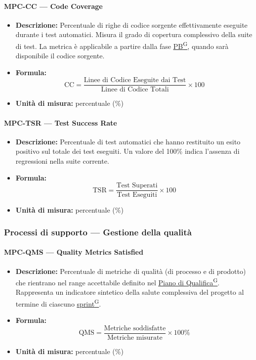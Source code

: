 \documentclass[a4paper,12pt]{article}
\providecommand{\glslink}[2]{\href{https://alittlebyte-19.github.io/Documentazione/glossario.html\#gls-#1}{\underline{#2}\textsuperscript{\scriptsize G}}}
\begin{document}
\paragraph{MPC-CC --- Code Coverage}
\begin{itemize}
    \item \textbf{Descrizione:} Percentuale di righe di codice sorgente effettivamente eseguite durante i test automatici. Misura il grado di copertura complessivo della suite di test. La metrica è applicabile a partire dalla fase \glslink{pb-product-baseline}{PB}, quando sarà disponibile il codice sorgente.
    \item \textbf{Formula:}
    $$\text{CC} = \frac{\text{Linee di Codice Eseguite dai Test}}{\text{Linee di Codice Totali}} \times 100$$
    \item \textbf{Unità di misura:} percentuale (\%)
\end{itemize}

\paragraph{MPC-TSR --- Test Success Rate}
\begin{itemize}
    \item \textbf{Descrizione:} Percentuale di test automatici che hanno restituito un esito positivo sul totale dei test eseguiti. Un valore del 100\% indica l'assenza di regressioni nella suite corrente.
    \item \textbf{Formula:}
    $$\text{TSR} = \frac{\text{Test Superati}}{\text{Test Eseguiti}} \times 100$$
    \item \textbf{Unità di misura:} percentuale (\%)
\end{itemize}

\subsubsection{Processi di supporto --- Gestione della qualità}

\paragraph{MPC-QMS --- Quality Metrics Satisfied}
\begin{itemize}
    \item \textbf{Descrizione:} Percentuale di metriche di qualità (di processo e di prodotto) che rientrano nel range accettabile definito nel \glslink{piano-di-qualifica}{Piano di Qualifica}. Rappresenta un indicatore sintetico della salute complessiva del progetto al termine di ciascuno \glslink{sprint}{sprint}.
    \item \textbf{Formula:}
    $$\text{QMS} = \frac{\text{Metriche soddisfatte}}{\text{Metriche misurate}} \times 100\%$$
    \item \textbf{Unità di misura:} percentuale (\%)
\end{itemize}
\end{document}
